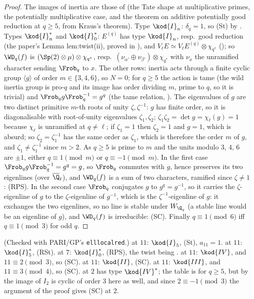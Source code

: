 \begin{proof}
The images of inertia are those of  (the Tate shape at multiplicative primes, the potentially multiplicative case, and the
theorem on additive potentially good reduction at $q\ge5$, from Kraus's theorem). Type $\kod{I}_n$: $\delta_q=1$, so (St) by .
Types $\kod{I}_n^*$ and $\kod{I}_0^*$: $E^{(q)}$ has type $\kod{I}_n$, resp.\ good reduction (the paper's Lemma lem:twist(ii), proved in ), and
$V_\ell E\simeq V_\ell E^{(q)}\otimes\chi_{q^*}$ (); so $\WD_q(f)$ is $(\Sp(2)\otimes\mu)\otimes\chi_{q^*}$, resp.\ $(\nu_{\alpha'}\oplus\nu_{\beta'})\otimes\chi_{q^*}$ with $\nu_x$ the
unramified character sending $\Frob_q$ to $x$. The other rows: inertia acts through a finite cyclic group $\langle g\rangle$ of order $m\in\{3,4,6\}$, so $N=0$; for $q\ge5$
the action is tame (the wild inertia group is pro-$q$ and its image has order dividing $m$, prime to $q$, so it is trivial) and $\Frob_qg\Frob_q^{-1}=g^q$ (the tame
relation, ). The eigenvalues of $g$ are two distinct primitive $m$-th roots of unity $\zeta,\zeta^{-1}$: $g$ has finite order, so it is diagonalisable with root-of-unity
eigenvalues $\zeta_1,\zeta_2$; $\zeta_1\zeta_2=\det g=\chi_\ell(g)=1$ because $\chi_\ell$ is unramified at $q\ne\ell$; if $\zeta_1=1$ then $\zeta_2=1$ and $g=1$, which is absurd; so $\zeta_2=\zeta_1^{-1}$ has the same order as
$\zeta_1$, which is therefore the order $m$ of $g$, and $\zeta_1\ne\zeta_1^{-1}$ since $m>2$. As $q\ge5$ is prime to $m$ and the units modulo $3$, $4$, $6$ are $\pm1$, either $q\equiv1\pmod m$ or $q\equiv-1\pmod m$. In the first case $\Frob_qg\Frob_q^{-1}=g^q=g$, so $\Frob_q$
commutes with $g$, hence preserves its two eigenlines (over $\overline\Q_\ell$), and $\WD_q(f)$ is a sum of two characters, ramified since $\zeta\ne1$: (RPS). In
the second case $\Frob_q$ conjugates $g$ to $g^{q}=g^{-1}$, so it carries the $\zeta$-eigenline of $g$ to the $\zeta$-eigenline of $g^{-1}$, which is the $\zeta^{-1}$-eigenline of $g$: it exchanges the two eigenlines, so no line is stable under $W_{\Q_q}$ (a stable line would be an
eigenline of $g$), and $\WD_q(f)$ is irreducible: (SC). Finally $q\equiv1\pmod 6$ iff $q\equiv1\pmod3$ for odd $q$.
\end{proof}

\begin{example}\label{ex:modgalrep:local-types}
(Checked with PARI/GP's \texttt{elllocalred}.)  at $11$: $\kod{I}_5$, (St), $a_{11}=1$.  at $11$: $\kod{I}_5^*$, (RSt).  at $7$: $\kod{I}_0^*$, (RPS),
the twist being .  at $11$: $\kod{IV}$, and $11\equiv2\pmod3$, so (SC).  at $11$: $\kod{II}$, (SC).  at $11$: $\kod{III}$, and $11\equiv3\pmod
4$, so (SC).  at $2$ has type $\kod{IV}^*$; the table is for $q\ge5$, but by  the image of $I_2$ is cyclic of order $3$ here as well, and
since $2\equiv-1\pmod3$ the argument of the proof gives (SC) at $2$.
\end{example}

